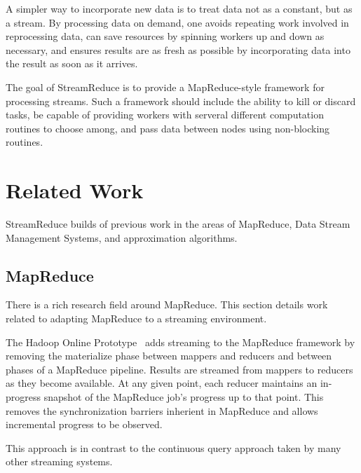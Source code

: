 \documentclass[12pt,twocolumn]{article}
\begin{document}
A simpler way to incorporate new data is to treat data not as a constant, but as a
stream. By processing data on demand, one avoids repeating work involved in reprocessing
data, can save resources
by spinning workers up and down as necessary, and ensures results are as fresh as possible
by incorporating data into the result as soon as it arrives.

The goal of StreamReduce is to provide a MapReduce-style framework for processing streams. Such a
framework should include the ability to kill or discard tasks, be capable of
providing workers with serveral different computation routines to choose among, and pass data
between nodes using non-blocking routines.

\section{Related Work}
\label{sec:relwork}
%

StreamReduce builds of previous work in the areas of MapReduce, Data Stream Management Systems,
and approximation algorithms.

\subsection{MapReduce}
There is a rich research field around MapReduce. This section details work related to adapting
MapReduce to a streaming environment.

The Hadoop Online Prototype~\cite{Condie:EECS-2009-136} adds streaming to the MapReduce framework
by removing the materialize phase between mappers and reducers and between phases of a
MapReduce pipeline. Results are streamed from mappers to reducers as they become available.
At any given point, each reducer maintains an in-progress snapshot of the MapReduce job's
progress up to that point. This removes the synchronization barriers inherient in MapReduce
and allows incremental progress to be observed.

This approach is in contrast to the continuous query approach taken by many other streaming
systems.
\end{document}
